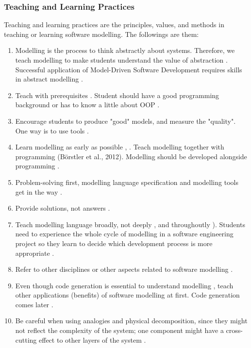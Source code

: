 \documentclass[12pt, a4paper]{report}
\begin{document}
\subsubsection{Teaching and Learning Practices}
Teaching and learning practices are the principles, values, and methods in teaching or learning software modelling. The followings are them:
\begin{enumerate}
\item Modelling is the process to think abstractly about systems. Therefore, we teach modelling to make students understand the value of abstraction \cite{bezivin2009teaching}. Successful application of Model-Driven Software Development requires skills in abstract modelling \cite{whittle2013industrial}.
\item Teach with prerequisites \cite{paige2014bad}. Student should have a good programming background \cite{bezivin2009teaching} or has to know a little about OOP \cite{Akayama2013}.
\item Encourage students to produce "good" models, and measure the "quality". One way is to use tools \cite{Akayama2013}.
\item Learn modelling as early as possible \cite{Akayama2013}, \cite{borstler2012teaching}. Teach modelling together with programming (Börstler et al., 2012). Modelling should be developed alongside programming \cite{bezivin2009teaching}.
\item Problem-solving first, modelling language specification and modelling tools get in the way \cite{paige2014bad}.
\item Provide solutions, not answers \cite{paige2014bad}.
\item Teach modelling language broadly, not deeply \cite{paige2014bad}, and throughoutly \cite{borstler2012teaching}). Students need to experience the whole cycle of modelling in a software engineering project so they learn to decide which development process is more appropriate \cite{Akayama2013}.
\item Refer to other disciplines or other aspects related to software modelling \cite{paige2014bad}.
\item Even though code generation is essential to understand modelling \cite{liebel2015ready},  teach other applications (benefits) of software modelling at first. Code generation comes later \cite{paige2014bad}.
\item Be careful when using analogies and physical decomposition, since they might not reflect the complexity of the system; one component might have a cross-cutting effect to other layers of the system \cite{paige2014bad}. 

\end{enumerate}
\end{document}
